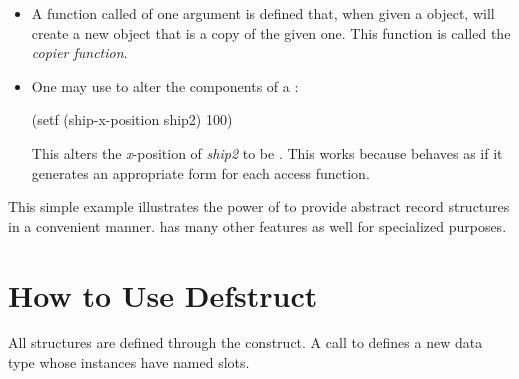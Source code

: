 \begin{itemize}
\item
A function called  of one argument
is defined that, when given a  object,
will create a new  object that is a copy of the given one.
This function is called the \emph{copier function}.

\item
One may use  to alter the components of a :
\begin{lisp}
(setf (ship-x-position ship2) 100)
\end{lisp}
This alters the \emph{x}-position of \emph{ship2} to be .
This works because  behaves as if
it generates an appropriate 
form for each access function.
\end{itemize}

This simple example illustrates the power of  to provide
abstract record structures in a convenient manner.
 has many other features as well for specialized purposes.

\section{How to Use Defstruct}

All structures are defined through the  construct.
A call to  defines a new data type whose instances
have named slots.


